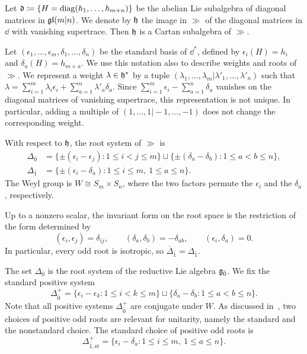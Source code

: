 Let ${\mathfrak{d}}\coloneqq\{H=\operatorname{diag}(h_1,\ldots,h_{m+n})\}$ be the abelian Lie subalgebra of diagonal matrices in ${\mathfrak{gl}(m\vert n)}$. We denote by ${\mathfrak h}$ the image in $\gg$ of the diagonal matrices in $\dd$ with vanishing supertrace. Then ${\mathfrak h}$ is a Cartan subalgebra of $\gg$.

Let $(\epsilon_1,\ldots,\epsilon_m,\delta_1,\ldots,\delta_n)$ be the standard basis of $\dd^{\ast}$, defined by $\epsilon_i(H)=h_i$ and $\delta_a(H)=h_{m+a}$. We use this notation also to describe weights and roots of $\gg$. We represent a weight $\lambda\in{\mathfrak h}^{\ast}$ by a tuple $(\lambda_1,\ldots,\lambda_m\vert\lambda'_1,\ldots,\lambda'_n)$ such that
$
\lambda=\sum_{i=1}^m\lambda_i\epsilon_i+\sum_{a=1}^n\lambda'_a\delta_a.
$
Since $\sum_{i=1}^m\epsilon_i-\sum_{a=1}^n\delta_a$ vanishes on the diagonal matrices of vanishing supertrace, this representation is not unique. In particular, adding a multiple of $(1,\ldots,1\vert-1,\ldots,-1)$ does not change the corresponding weight.

With respect to ${\mathfrak h}$, the root system of $\gg$ is
\begin{equation}
\begin{aligned}
\Delta_{\bar0}
&=
\{\pm(\epsilon_i-\epsilon_j):1\leq i< j\leq m\}
\sqcup
\{\pm(\delta_a-\delta_b):1\leq a< b\leq n\},\\
\Delta_{\bar1}
&=
\{\pm(\epsilon_i-\delta_a):1\leq i\leq m,\ 1\leq a\leq n\}.
\end{aligned}
\end{equation}
The Weyl group is $W\cong S_m\times S_n$, where the two factors permute the $\epsilon_i$ and the $\delta_a$, respectively.

Up to a nonzero scalar, the invariant form on the root space is the restriction of the form determined by
\begin{equation}
(\epsilon_i,\epsilon_j)=\delta_{ij},
\qquad
(\delta_a,\delta_b)=-\delta_{ab},
\qquad
(\epsilon_i,\delta_a)=0.
\end{equation}
In particular, every odd root is isotropic, so
$
\overline{\Delta}_{\bar1}=\Delta_{\bar1}.
$

The set $\Delta_{\bar0}$ is the root system of the reductive Lie algebra ${\mathfrak{g}_{\bar{0}}}$. We fix the standard positive system
\begin{equation}
\Delta_{\bar0}^+
=
\{\epsilon_i-\epsilon_k:1\leq i<k\leq m\}
\sqcup
\{\delta_a-\delta_b:1\leq a<b\leq n\}.
\end{equation}
Note that all positive systems $\Delta_{\bar{0}}^{+}$ are conjugate under $W$. As discussed in~\cite{Schmidt,Schmidt_unitary_branching}, two choices of positive odd roots are relevant for unitarity, namely the standard and the nonstandard choice. The standard choice of positive odd roots is
\begin{equation}
\Delta_{\bar1,\mathrm{st}}^+
=
\{\epsilon_i-\delta_a:1\leq i\leq m,\ 1\leq a\leq n\}.
\end{equation}

